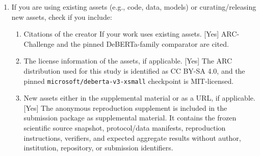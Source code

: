 \begin{enumerate}[leftmargin=*]
\begin{enumerate}
    \item The code, data, and instructions needed to reproduce the main experimental results (either in the supplemental material or as a URL). [Yes] The deterministic anonymous supplement contains the frozen source snapshot, ARC protocol and checksum manifest, a train/validation-only official-data downloader, exact five-seed reproduction commands, verification scripts, and expected aggregate results. It does not redistribute the third-party ARC corpus or expose the locked test split.
    \item All the training details (e.g., data splits, hyperparameters, how they were chosen). [Yes] The paper gives retained train/validation sizes, five fixed seeds, epochs, batch size, learning rate, model steps, device class, and the pinned pretrained checkpoint, together with frozen objective and decision gates.
    \item A clear definition of the specific measure or statistics and error bars (e.g., with respect to the random seed after running experiments multiple times). [Yes] The paper defines means, sample standard deviations, seed pairing, and retained paired bootstrap intervals.
    \item A description of the computing infrastructure used. (e.g., type of GPUs, internal cluster, or cloud provider). [No] CPU execution is retained, but exact physical CPU model metadata was not retained and is not reconstructed.
  \end{enumerate}
\item If you are using existing assets (e.g., code, data, models) or curating/releasing new assets, check if you include:
  \begin{enumerate}
    \item Citations of the creator If your work uses existing assets. [Yes] ARC-Challenge and the pinned DeBERTa-family comparator are cited.
    \item The license information of the assets, if applicable. [Yes] The ARC distribution used for this study is identified as CC BY-SA 4.0, and the pinned \texttt{microsoft/deberta-v3-xsmall} checkpoint is MIT-licensed.
    \item New assets either in the supplemental material or as a URL, if applicable. [Yes] The anonymous reproduction supplement is included in the submission package as supplemental material. It contains the frozen scientific source snapshot, protocol/data manifests, reproduction instructions, verifiers, and expected aggregate results without author, institution, repository, or submission identifiers.

\end{enumerate}
\end{enumerate}
